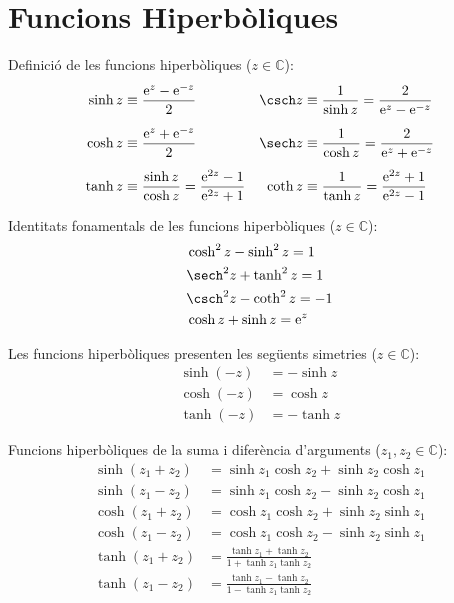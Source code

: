 \section{Funcions Hiperb\`{o}liques}

Definici\'{o} de les funcions hiperb\`{o}liques ($z\in\mathbb{C}$):
\begin{subequations}
\begin{align}
    \sinh z&\equiv \frac{\eu^z - \eu^{-z}}{2} & \csch z &\equiv\frac{1}{\sinh z} =
    \frac{2}{\eu^z - \eu^{-z}}\\[1ex]
    \cosh z&\equiv \frac{\eu^z + \eu^{-z}}{2} & \sech z &\equiv\frac{1}{\cosh z} =
    \frac{2}{\eu^z + \eu^{-z}}\\[1ex]
    \tanh z&\equiv \frac{\sinh z}{\cosh z} = \frac{\eu^{2z}-1}{\eu^{2z}+1} &
    \coth z &\equiv\frac{1}{\tanh z} = \frac{\eu^{2z}+1}{\eu^{2z}-1}
\end{align}
\end{subequations}

Identitats fonamentals de les funcions hiperb\`{o}liques
($z\in\mathbb{C}$):
\begin{align}
    &\cosh^2 z - \sinh^2 z = 1 \\
    &\sech^2 z + \tanh^2 z = 1 \\
    &\csch^2 z - \coth^2 z = -1 \\
    &\cosh z + \sinh z = \eu^z
\end{align}

Les funcions hiperb\`{o}liques presenten les seg\"{u}ents simetries
($z\in\mathbb{C}$):
\begin{subequations}
\begin{align}
    \sinh (-z) &= -\sinh z \\
    \cosh (-z) &= \cosh z\\
    \tanh (-z) &= -\tanh z
\end{align}
\end{subequations}

Funcions hiperb\`{o}liques de la suma i difer\`{e}ncia d'arguments ($z_1,
z_2\in\mathbb{C}$):
\begin{subequations}
\begin{align}
    \sinh(z_1+z_2) &= \sinh z_1 \cosh z_2 + \sinh z_2\cosh z_1\\[1ex]
    \sinh(z_1-z_2) &= \sinh z_1 \cosh z_2 - \sinh z_2\cosh z_1\\[1ex]
    \cosh(z_1+z_2) &= \cosh z_1 \cosh z_2 + \sinh z_2\sinh z_1\\[1ex]
    \cosh(z_1-z_2) &= \cosh z_1 \cosh z_2 - \sinh z_2\sinh z_1\\[1ex]
    \tanh(z_1+z_2) &=\frac{\tanh z_1+\tanh z_2}{1+\tanh z_1\tanh z_2}\\[1ex]
    \tanh(z_1-z_2) &=\frac{\tanh z_1-\tanh z_2}{1-\tanh z_1\tanh z_2}
\end{align}
\end{subequations}

